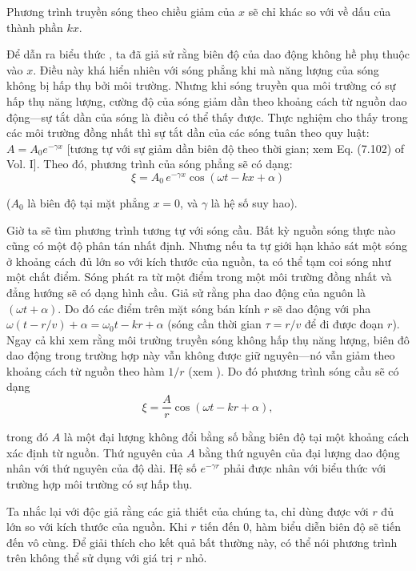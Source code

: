 \noindent
Phương trình truyền sóng theo chiều giảm của $x$ sẽ chỉ khác so với  về dấu của thành phần $kx$.

Để dẫn ra biểu thức , ta đã giả sử rằng biên độ của dao động không hề phụ thuộc vào $x$. Điều này khá hiển nhiên với sóng phẳng khi mà năng lượng của sóng không bị hấp thụ bởi môi trường. Nhưng khi sóng truyền qua môi trường có sự hấp thụ năng lượng, cường độ của sóng giảm dần theo khoảng cách từ nguồn dao động---sự tắt dần của sóng là điều có thể thấy được. Thực nghiệm cho thấy trong các môi trường đồng nhất thì sự tắt dần của các sóng tuân theo quy luật: $A = A_0 e^{-\gamma x}$ [tương tự với sự giảm dần biên độ theo thời gian; xem Eq. (7.102) of Vol. I]. Theo đó, phương trình của sóng phẳng sẽ có dạng:
\begin{equation}\label{eq:14_11}
    \xi = A_0\, e^{-\gamma x} \cos(\omega t - kx + \alpha)
\end{equation}

\noindent
($A_0$ là biên độ tại mặt phẳng $x=0$, và $\gamma$ là hệ số suy hao).

Giờ ta sẽ tìm phương trình tương tự với sóng cầu. Bất kỳ nguồn sóng thực nào cũng có một độ phân tán nhất định. Nhưng nếu ta tự giới hạn khảo sát một sóng ở khoảng cách đủ lớn so với kích thước của nguồn, ta có thể tạm coi sóng như một chất điểm. Sóng phát ra từ một điểm trong một môi trường đồng nhất và đẳng hướng sẽ có dạng hình cầu. Giả sử rằng pha dao động của nguôn là $(\omega t + \alpha)$. Do đó các điểm trên mặt sóng bán kính $r$ sẽ dao động với pha $\omega (t - r/v) + \alpha = \omega_0t - kr + \alpha$ (sóng cần thời gian $\tau = r/v$ để đi được đoạn $r$). Ngay cả khi xem rằng môi trường truyền sóng không hấp thụ năng lượng, biên đô dao động trong trường hợp này vẫn không được giữ nguyên---nó vẫn giảm theo khoảng cách từ nguồn theo hàm $1/r$ (xem ). Do đó phương trình sóng cầu sẽ có dạng
\begin{equation}\label{eq:14_12}
    \xi = \frac{A}{r} \cos(\omega t - kr + \alpha),
\end{equation}

\noindent
trong đó $A$ là một đại lượng không đổi bằng số bằng biên độ tại một khoảng cách xác định từ nguồn. Thứ nguyên của $A$ bằng thứ nguyên của đại lượng dao động nhân với thứ nguyên của độ dài. Hệ số $e^{-\gamma r}$ phải được nhân với biểu thức  với trường hợp môi trường có sự hấp thụ.

Ta nhắc lại với độc giả rằng các giả thiết của chúng ta,  chỉ dùng được với $r$ đủ lớn so với kích thước của nguồn. Khi $r$ tiến đến $0$, hàm biểu diễn biên độ sẽ tiến đến vô cùng. Để giải thích cho kết quả bất thường này, có thể nói phương trình trên không thể sử dụng với giá trị $r$ nhỏ.

